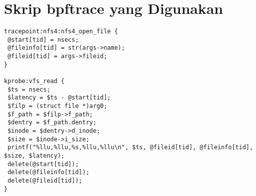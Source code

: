 \chapter{Skrip bpftrace yang Digunakan}
\label{sec:skripbpf}

\vspace{1.5pt}

\lstset{
  frame=single,       %
  breaklines=true,    %
  breakatwhitespace=false, %
  basicstyle=\ttfamily\small %
}

\begin{lstlisting}
tracepoint:nfs4:nfs4_open_file {
 @start[tid] = nsecs;
 @fileinfo[tid] = str(args->name);
 @fileid[tid] = args->fileid;
}

kprobe:vfs_read {
 $ts = nsecs;
 $latency = $ts - @start[tid];
 $filp = (struct file *)arg0;
 $f_path = $filp->f_path;
 $dentry = $f_path.dentry;
 $inode = $dentry->d_inode;
 $size = $inode->i_size;
 printf("%llu,%llu,%s,%llu,%llu\n", $ts, @fileid[tid], @fileinfo[tid], $size, $latency);
 delete(@start[tid]);
 delete(@fileinfo[tid]);
 delete(@fileid[tid]);
}
\end{lstlisting}

